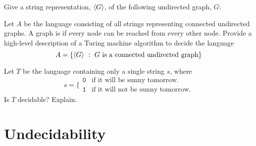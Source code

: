 \documentclass[twoside,letterpaper,openany]{book}
\begin{document}
\begin{exer}
Give a string representation, ${\langle{G}\rangle}$, of the following undirected graph, $G$:

\begin{center}
\end{center}
\end{exer}

\begin{exer}  %
Let $A$ be the language consisting of all strings representing connected undirected graphs. A graph is  if every node can be reached from every other node. Provide a high-level description of a Turing machine algorithm to decide the language
\[ A = \left\lbrace {\langle{G}\rangle}\ :\ G~\textrm{is a connected undirected graph} \right\rbrace \]
\end{exer}

\begin{exer}
Let $T$ be the language containing only a single string $s$, where
\[ s = \bigg\{
\begin{array}{ll}
\texttt{0} &  \textrm{if it will be sunny tomorrow.} \\
\texttt{1} & \textrm{if it will not be sunny tomorrow.}
\end{array}
\]
Is $T$ decidable? Explain. 
\end{exer}

\clearpage

\section{Undecidability}
\end{document}
